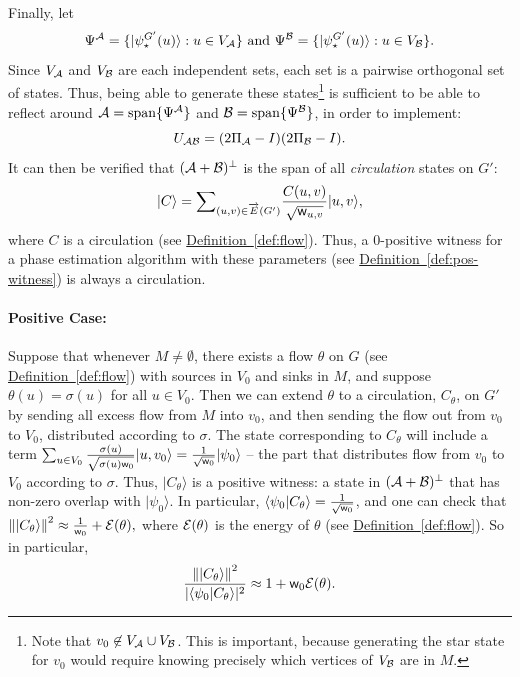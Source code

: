 \documentclass{theoretics}
\newcommand{\defin}[1]{\hyperref[def:#1]{Definition~\ref*{def:#1}}}
\def\ket#1{{\lvert}#1\rangle}
\renewcommand{\>}{\rangle}
\newcommand{\<}{\langle}
\renewcommand{\(}{\left(}
\renewcommand{\)}{\right)}
\def\braket#1#2{{{\langle}#1\vert}#2\rangle}
\def\norm#1{\left\| #1 \right\|}
\def\w{{\sf w}}
\begin{document}
Finally, let 
$$\Psi^{\cal A}=\{\ket{\psi_\star^{G'}(u)}:u\in V_{\cal A}\}
\mbox{ and }
\Psi^{\cal B}=\{\ket{\psi_\star^{G'}(u)}:u\in V_{\cal B}\}.$$
Since $V_{\cal A}$ and $V_{\cal B}$ are each independent sets, each set is a pairwise orthogonal set of states. Thus, being able to generate these states\footnote{Note that $v_0\not\in V_{\cal A}\cup V_{\cal B}$. This is important, because generating the star state for $v_0$ would require knowing precisely which vertices of $V_{\cal B}$ are in $M$.} is sufficient to be able to reflect around ${\cal A}=\mathrm{span}\{\Psi^{\cal A}\}$ and ${\cal B}=\mathrm{span}\{\Psi^{\cal B}\}$, in order to implement:
$$U_{\cal AB}=(2\Pi_{\cal A}-I)(2\Pi_{\cal B}-I).$$
It can then be verified that $({\cal A}+{\cal B})^\bot$ is the span of all \emph{circulation} states on $G'$:
$$\ket{C}=\textstyle{\displaystyle\sum}_{(u,v)\in \overrightarrow{E}(G')}\displaystyle\frac{C(u,v)}{\sqrt{\w_{u,v}}}\ket{u,v},$$
where $C$ is a circulation (see \defin{flow}). Thus, a 0-positive witness for a phase estimation algorithm with these parameters (see \defin{pos-witness}) is always a circulation. 

\paragraph{Positive Case:} Suppose that whenever $M\neq\emptyset$, there exists a flow $\theta$ on $G$ (see \defin{flow}) with sources in $V_0$ and sinks in $M$, and suppose $\theta(u)=\sigma(u)$ for all $u\in V_0$. Then we can extend $\theta$ to a circulation, $C_\theta$, on $G'$ by sending all excess flow from $M$ into $v_0$, and then sending the flow out from $v_0$ to $V_0$, distributed according to $\sigma$. The state corresponding to $C_\theta$ will include a term $\sum_{u\in V_0}\frac{\sigma(u)}{\sqrt{\sigma(u) \w_0}}\ket{u,v_0}=\frac{1}{\sqrt{\w_0}}\ket{\psi_0}$ -- the part that distributes flow from $v_0$ to $V_0$ according to $\sigma$. Thus, $\ket{C_\theta}$ is a positive witness: a state in $({\cal A}+{\cal B})^\bot$ that has non-zero overlap with $\ket{\psi_0}$. In particular, $\braket{\psi_0}{C_\theta}=\frac{1}{\sqrt{\w_0}}$, and one can check that 
$\norm{\ket{C_\theta}}^2 \approx \frac{1}{\w_0}+{\cal E}(\theta),$
where ${\cal E}(\theta)$ is the energy of $\theta$ (see \defin{flow}). So in particular, 
$$\frac{\norm{\ket{C_\theta}}^2}{|\braket{\psi_0}{C_\theta}|^2} \approx 1+\w_0 {\cal E}(\theta).$$
\end{document}
